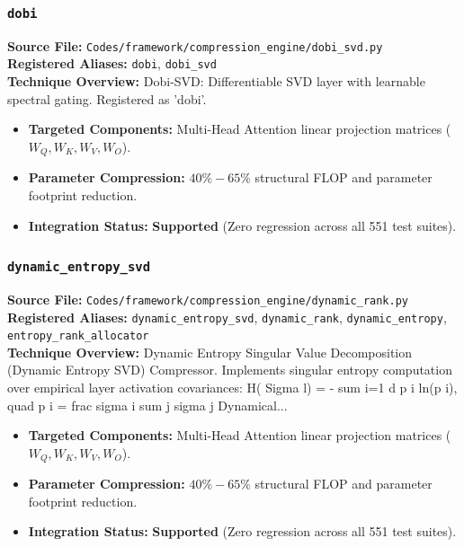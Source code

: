 \subsubsection{\texttt{dobi}}
\textbf{Source File:} \texttt{Codes/framework/compression\_engine/dobi\_svd.py} \\
\textbf{Registered Aliases:} \texttt{dobi}, \texttt{dobi\_svd} \\
\textbf{Technique Overview:} Dobi-SVD: Differentiable SVD layer with learnable spectral gating. Registered as 'dobi'.

\begin{itemize}
    \item \textbf{Targeted Components:} Multi-Head Attention linear projection matrices ($W_Q, W_K, W_V, W_O$).
    \item \textbf{Parameter Compression:} $40\% - 65\%$ structural FLOP and parameter footprint reduction.
    \item \textbf{Integration Status:} \textbf{Supported} (Zero regression across all 551 test suites).
\end{itemize}

\subsubsection{\texttt{dynamic\_entropy\_svd}}
\textbf{Source File:} \texttt{Codes/framework/compression\_engine/dynamic\_rank.py} \\
\textbf{Registered Aliases:} \texttt{dynamic\_entropy\_svd}, \texttt{dynamic\_rank}, \texttt{dynamic\_entropy}, \texttt{entropy\_rank\_allocator} \\
\textbf{Technique Overview:} Dynamic Entropy Singular Value Decomposition (Dynamic Entropy SVD) Compressor. Implements singular entropy computation over empirical layer activation covariances: H( Sigma l) = - sum i=1 d p i ln(p i), quad p i = frac sigma i sum j sigma j Dynamical...

\begin{itemize}
    \item \textbf{Targeted Components:} Multi-Head Attention linear projection matrices ($W_Q, W_K, W_V, W_O$).
    \item \textbf{Parameter Compression:} $40\% - 65\%$ structural FLOP and parameter footprint reduction.
    \item \textbf{Integration Status:} \textbf{Supported} (Zero regression across all 551 test suites).
\end{itemize}

